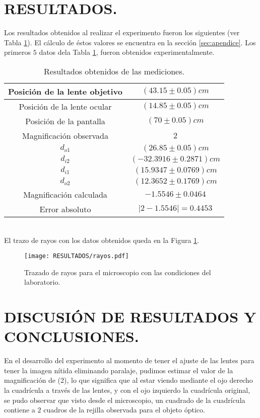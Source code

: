 \documentclass[10pt,a4paper]{article}
\begin{document}
\section{RESULTADOS.} %
Los resultados obtenidos al realizar el experimento fueron los siguientes (ver Tabla \ref{tab:resultados}). El cálculo de éstos valores se encuentra en la sección \ref{sec:apendice}. Los primeros \(5\) datos dela Tabla \ref{tab:resultados}, fueron obtenidos experimentalmente.
\begin{table}[ht]
\centering
\caption{Resultados obtenidos de las mediciones.}
\begin{tabular}{|c|c|}
	\hline
	Posición de la lente objetivo & $ (43.15\pm0.05)cm $ \\ 	\hline
	Posición de la lente ocular & $ (14.85\pm0.05)cm $  \\ 	\hline
	Posición de la pantalla & $ (70\pm0.05) cm $  \\ 	\hline
	Magnificación observada & $ 2 $ \\ 	\hline
	$d_{o1}$ & $ (26.85\pm 0.05) cm $  \\ 	\hline
	$d_{i2}$ & $ (-32.3916\pm 0.2871) cm $ \\ 	\hline
	$d_{i1} $ & $ (15.9347\pm0.0769)cm $  \\ 	\hline
	$d_{o2}$ & $ (12.3652\pm0.1769)cm $  \\ 	\hline
	Magnificación calculada & $ -1.5546\pm0.0464 $  \\ 	\hline
	Error absoluto &  $ |2-1.5546|=0.4453 $\\ 	\hline
\end{tabular}
	\label{tab:resultados}
\end{table}\\
El trazo de rayos con los datos obtenidos queda en la Figura \ref{fig:rayos}.
\begin{figure}[ht]
	\centering
	\texttt{[image: RESULTADOS/rayos.pdf]}
	\caption{Trazado de rayos para el microscopio con las condiciones del laboratorio.}
	\label{fig:rayos}
\end{figure}

\newpage

\section{DISCUSIÓN DE RESULTADOS Y CONCLUSIONES.} %
En el desarrollo del experimento al momento de tener el ajuste de las lentes para tener la imagen nítida eliminando paralaje, pudimos estimar el valor de la magnificación de (2), lo que significa que al estar viendo mediante el ojo derecho la cuadrícula a través de las lentes, y con el ojo izquierdo la cuadrícula original, se pudo observar que visto desde el microscopio, un cuadrado de la cuadrícula contiene a $2$ cuadros de la rejilla observada para el objeto óptico. \\[2mm]
\end{document}
